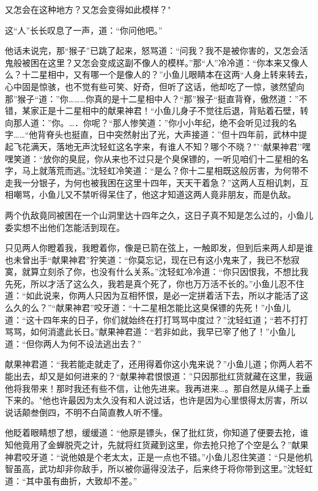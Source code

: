 \documentclass[12pt,oneside]{book}
\begin{document}
又怎会在这种地方？又怎会变得如此模样？"

这``人''长长叹息了一声，道：``你问他吧。''

他话未说完，那``猴子''已跳了起来，怒骂道：``问我？我不是被你害的，又怎会活鬼般被困在这里？又怎会变成这副不像人的模样。''那``人''冷冷道：``你本来又像人么？十二星相中，又有哪一个是像人的？''小鱼儿眼睛本在这两``人身上转来转去，心中固是惊骇，也不觉有些可笑、好奇，但听了这话，他却吃了一惊，骇然望向那''猴子``道：''你\ldots\ldots\ldots 你真的是十二星相中人？``那''猴子``挺直背脊，傲然道：''不错，某家正是十二星相中的献果神君！``小鱼儿身子不觉往后退，背贴着石壁，转向那人道：''你。\ldots．你呢？``那人惨笑道：''你小小年纪，绝不会听见过我的名字\ldots\ldots{}``他背脊头也挺直，日中突然射出了光，大声接道：''但十四年前，武林中提起飞花满天，落地无声沈轻虹这名字来，有谁人不知？哪个不晓？"``献果神君''嘿嘿笑道：``放你的臭屁，你从来也不过只是个臭保镖的，一听见咱们十二星相的名字，马上就落荒而逃。''沈轻虹冷笑道：``是么？你十二星相既这般厉害，为何带不走我一分银子，为何也被我困在这里十四年，天天干着急？''这两人互相讥刺，互相嘲骂，小鱼儿又不禁听得呆住了，他这才知道这两人竟非朋友，而是仇敌。

两个仇敌竟同被困在一个山洞里达十四年之久，这日子真不知是怎么过的，小鱼儿委实想不出他们怎能活到现在。

只见两人你瞪着我，我瞪着你，像是已箭在弦上，一触即发，但到后来两人却是谁也未曾出手``献果神君''狞笑道：``你莫忘记，现在已有这小鬼来了，我已不愁寂寞，就算立刻杀了你，也没有什么关系。''沈轻虹冷冷道：``你只因恨我，不想比我先死，所以才活了这么久，我若是真个死了，你也万万活不长的。''小鱼儿忍不住道：``如此说来，你两人只因为互相怀恨，是必一定拼着活下去，所以才能活了这么久的么？''``献果神君''咬牙道：``十二星相怎能比这臭保镖的先死！''小鱼儿道：``这十四年来的日子，你们就始终在打打骂骂中度过？''沈轻虹道；``若不打打骂骂，如何消遣此长日。''献果神君道：``若非如此，我早已宰了他了！''小鱼儿道：``但你两人为何不设法逃出去？''

献果神君道：``我若能走就走了，还用得着你这小鬼来说？''小鱼儿道；你两人若不能出去，却又是如何进来的？``献果神君恨恨道：''只因那批红货就藏在这里，我逼他将我带来！那时我还有些不信，让他先进来。我再进来\ldots。那自然是从绳子上垂下来的。"他也许最因为太久没有和人说过话，也许是因为心里恨得太厉害，所以说话颠叁倒四，不明不白简直教人听不懂。

他眨着眼睛想了想，缓缓道：``他原是镖头，保了批红货，你知道了便要去抢，谁知他竟用了金蝉脱壳之计，先就将红货藏到这里，你去抢只抢了个空是么？''献果神君咬牙道：``说他娘是个老太太，正是一点也不错。''小鱼儿忍住笑道：``只是他机智虽高，武功却非你敌手，所以被你逼得没法子，后来终于将你带到这里。''沈轻虹道：``其中虽有曲折，大致却不差。''
\end{document}
